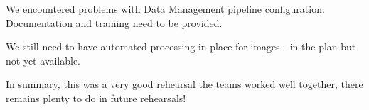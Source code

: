 \item We encountered problems with Data Management pipeline configuration. Documentation and training need to be provided.

\item We still need to have automated processing in place for images - in the plan but not yet available.

In summary, this was a very good rehearsal the teams worked well together, there remains plenty to do in future rehearsals!





